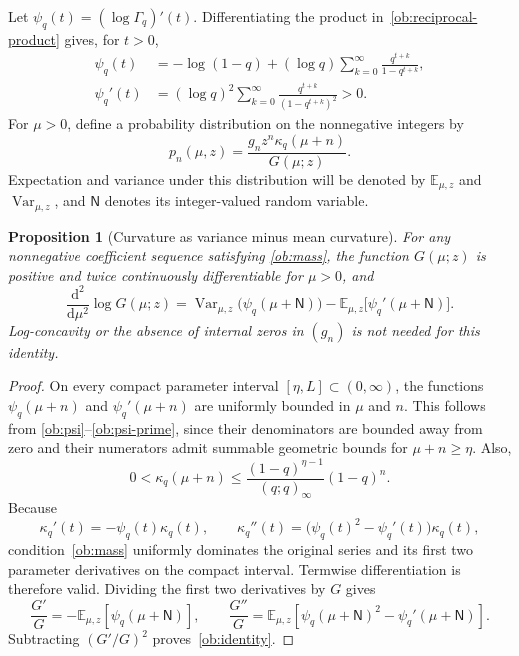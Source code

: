 \documentclass[11pt,a4paper]{article}
\newtheorem{proposition}[theorem]{Proposition}
\theoremstyle{definition}
\theoremstyle{remark}
\begin{document}
Let \(\psi_q(t)=(\log\Gamma_q)'(t)\). Differentiating the product
in~\eqref{ob:reciprocal-product} gives, for \(t>0\),
\begin{align}
 \psi_q(t)
 &=-\log(1-q)+(\log q)\sum_{k=0}^{\infty}
       \frac{q^{t+k}}{1-q^{t+k}},\label{ob:psi}\\
 \psi_q'(t)
 &=(\log q)^2\sum_{k=0}^{\infty}
       \frac{q^{t+k}}{(1-q^{t+k})^2}>0.
       \label{ob:psi-prime}
\end{align}
For \(\mu>0\), define a probability distribution on the
nonnegative integers by
\begin{equation}\label{ob:weights}
 p_n(\mu,z)=\frac{g_nz^n\kappa_q(\mu+n)}{G(\mu;z)}.
\end{equation}
Expectation and variance under this distribution will be denoted by
\(\mathbb E_{\mu,z}\) and \(\operatorname{Var}_{\mu,z}\), and
\(\mathsf N\) denotes its integer-valued random variable.

\begin{proposition}[Curvature as variance minus mean curvature]
\label{ob:variance}
For any nonnegative coefficient sequence satisfying
\eqref{ob:mass}, the function \(G(\mu;z)\) is positive and
twice continuously differentiable for \(\mu>0\), and
\begin{equation}\label{ob:identity}
 \frac{\mathrm d^2}{\mathrm d\mu^2}\log G(\mu;z)
 =\operatorname{Var}_{\mu,z}\!\bigl(\psi_q(\mu+\mathsf N)\bigr)
  -\mathbb E_{\mu,z}\!\bigl[\psi_q'(\mu+\mathsf N)\bigr].
\end{equation}
Log-concavity or the absence of internal zeros in \((g_n)\) is not
needed for this identity.
\end{proposition}

\begin{proof}
On every compact parameter interval \([\eta,L]\subset(0,\infty)\),
the functions \(\psi_q(\mu+n)\) and \(\psi_q'(\mu+n)\) are
uniformly bounded in \(\mu\) and \(n\). This follows from
\eqref{ob:psi}--\eqref{ob:psi-prime}, since their denominators are
bounded away from zero and their numerators admit summable geometric
bounds for \(\mu+n\ge\eta\). Also,
\[
 0<\kappa_q(\mu+n)
 \le\frac{(1-q)^{\eta-1}}{(q;q)_\infty}(1-q)^n.
\]
Because
\[
 \kappa_q'(t)=-\psi_q(t)\kappa_q(t),\qquad
 \kappa_q''(t)=\bigl(\psi_q(t)^2-\psi_q'(t)\bigr)\kappa_q(t),
\]
condition~\eqref{ob:mass} uniformly dominates the original series
and its first two parameter derivatives on the compact interval.
Termwise differentiation is therefore valid. Dividing the first two
derivatives by \(G\) gives
\[
 \frac{G'}G=-\mathbb E_{\mu,z}[\psi_q(\mu+\mathsf N)],
 \qquad
 \frac{G''}G=
 \mathbb E_{\mu,z}[\psi_q(\mu+\mathsf N)^2-\psi_q'(\mu+\mathsf N)].
\]
Subtracting \((G'/G)^2\) proves~\eqref{ob:identity}.
\end{proof}
\end{document}
